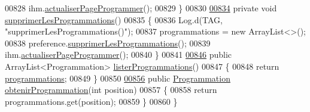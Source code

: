 \begin{DoxyCode}
00828         ihm.\hyperlink{classcom_1_1example_1_1ekawa_1_1_ihm_adbeeac61b5a53c52d21da490659de983}{actualiserPageProgrammer}();
00829     \}
00830 
\hyperlink{classcom_1_1example_1_1ekawa_1_1_cafetiere_a6d1bc4321c372f7639a3305cf74f10db}{00834}     \textcolor{keyword}{private} \textcolor{keywordtype}{void} \hyperlink{classcom_1_1example_1_1ekawa_1_1_cafetiere_a6d1bc4321c372f7639a3305cf74f10db}{supprimerLesProgrammations}()
00835     \{
00836         Log.d(TAG, \textcolor{stringliteral}{"supprimerLesProgrammations()"});
00837         programmations = \textcolor{keyword}{new} ArrayList<>();
00838         preference.\hyperlink{classcom_1_1example_1_1ekawa_1_1_preference_aec0e98bb3cfb4d104c5c86a4259c56b5}{supprimerLesProgrammations}();
00839         ihm.\hyperlink{classcom_1_1example_1_1ekawa_1_1_ihm_adbeeac61b5a53c52d21da490659de983}{actualiserPageProgrammer}();
00840     \}
00841 
\hyperlink{classcom_1_1example_1_1ekawa_1_1_cafetiere_af82120eee3f2f7dbb28f74e663bfe15a}{00846}     \textcolor{keyword}{public} ArrayList<Programmation> \hyperlink{classcom_1_1example_1_1ekawa_1_1_cafetiere_af82120eee3f2f7dbb28f74e663bfe15a}{listerProgrammations}()
00847     \{
00848         \textcolor{keywordflow}{return} \hyperlink{classcom_1_1example_1_1ekawa_1_1_cafetiere_a987c8e1bcea506b65f4b05f955b3f699}{programmations};
00849     \}
00850 
\hyperlink{classcom_1_1example_1_1ekawa_1_1_cafetiere_aaaaa95b5ed36da9d14f5aa60116a66b8}{00856}     \textcolor{keyword}{public} \hyperlink{classcom_1_1example_1_1ekawa_1_1_programmation}{Programmation} \hyperlink{classcom_1_1example_1_1ekawa_1_1_cafetiere_aaaaa95b5ed36da9d14f5aa60116a66b8}{obtenirProgrammation}(\textcolor{keywordtype}{int} position)
00857     \{
00858         \textcolor{keywordflow}{return} programmations.get(position);
00859     \}
00860 \}
\end{DoxyCode}
